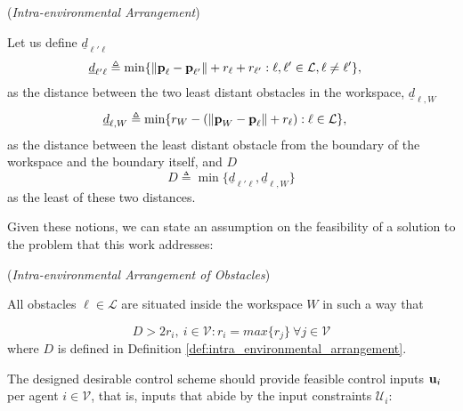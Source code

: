 \begin{bw_box}
\begin{definition} (\textit{Intra-environmental Arrangement})
\label{def:intra_environmental_arrangement}

  Let us define $\underline{d}_{\ell'\ell}$
  \begin{align}
    \underline{d}_{\ell'\ell} &\triangleq \min\{\| \bm{\mathbf{p}}_{\ell} - \bm{\mathbf{p}}_{\ell'}\| + r_{\ell} + r_{\ell'} :
      \ell,\ell' \in \mathcal{L}, \ell \neq \ell' \},
  \end{align}
  as the distance between the two least distant obstacles in the workspace,
  $\underline{d}_{\ell,W}$
  \begin{align}
    \underline{d}_{\ell,W} & \triangleq \min\{r_W - (\|\bm{\mathbf{p}}_W - \bm{\mathbf{p}}_{\ell}\| + r_{\ell}) : \ell \in \mathcal{L}\},
  \end{align}
  as the distance between the least distant obstacle from the boundary of the
  workspace and the boundary itself, and $D$
  \begin{equation}
    D \triangleq \min\{\underline{d}_{\ell'\ell}, \underline{d}_{\ell,W}\}
  \end{equation}
  as the least of these two distances.
\end{definition}
\end{bw_box}
Given these notions, we can state an assumption on the feasibility of a
solution to the problem that this work addresses:\\[1ex]

\begin{gg_box}
  \begin{assumption}(\textit{Intra-environmental Arrangement of Obstacles})
  \label{ass:intra_environmental_arrangement}

    All obstacles $\ell \in \mathcal{L}$ are situated inside the workspace $W$
    in such a way that

  \begin{equation}
    D > 2 r_i,\ i \in \mathcal{V} : r_i = max\{r_j\}\ \forall j \in \mathcal{V}
  \label{eq:geometric_constraint}
  \end{equation}
  where $D$ is defined in Definition \eqref{def:intra_environmental_arrangement}.
\end{assumption}
\end{gg_box}

The designed desirable control scheme should provide feasible control
inputs $\bm{\mathbf{u}}_i$
per agent $i \in \mathcal{V}$, that is, inputs that abide by the input
constraints $\mathcal{U}_i$:\\[1ex]

